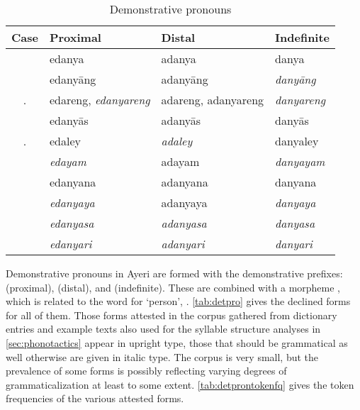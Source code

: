 \begin{table}[tp]\centering
\caption{Demonstrative pronouns}

\begin{tabu} to .75\linewidth{S[2] X[4c] X[4c] X[4c]}
\tableheaderfont\toprule

Case
	& Proximal
	& Distal
	& Indefinite
	\\
\toprule

\Top{}
	& edanya
	& adanya
	& danya
	\\
	
\midrule
	
\Aarg{}
	& edanyāng
	& adanyāng
	& \emph{danyāng}
	\\

\Aarg{}.\Inan{}
	& edareng, \emph{edanyareng}
	& adareng, adanyareng
	& \emph{danyareng}
	\\
	
\Parg{}
	& edanyās
	& adanyās
	& danyās
	\\

\Parg{}.\Inan{}
	& edaley
	& \emph{adaley}
	& danyaley
	\\

\Dat{}
	& \emph{edayam}
	& adayam
	& \emph{danyayam}
	\\

\midrule

\Gen{}
	& edanyana
	& adanyana
	& danyana
	\\
	
\Loc{}
	& \emph{edanyaya}
	& adanyaya
	& \emph{danyaya}
	\\
	
\Caus{}
	& \emph{edanyasa}
	& \emph{adanyasa}
	& \emph{danyasa}
	\\
	
\Ins{}
	& \emph{edanyari}
	& \emph{adanyari}
	& \emph{danyari}
	\\

\bottomrule
\end{tabu}
\label{tab:detpro}
\end{table}

Demonstrative pronouns in Ayeri are formed with the demonstrative 
prefixes:  (proximal),  
(distal), and  (indefinite). These are combined with a 
morpheme , which is related to the word for `person', 
. \autoref{tab:detpro} gives the declined forms for all of 
them. Those forms attested in the corpus gathered from dictionary entries and 
example texts also used for the syllable structure analyses in 
\autoref{sec:phonotactics} appear in upright type, those that should be 
grammatical as well otherwise are given in italic type. The corpus is very 
small, but the prevalence of some forms is possibly reflecting varying degrees 
of grammaticalization at least to some extent. \autoref{tab:detprontokenfq} 
gives the token frequencies of the various attested forms.

